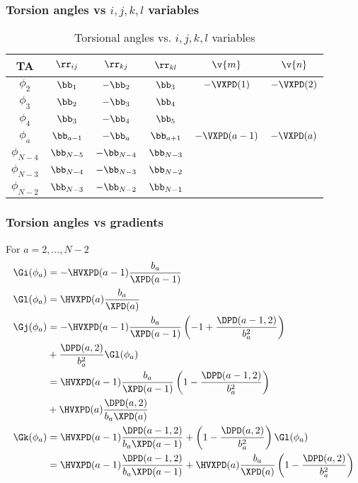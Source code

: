 \clearpage
\subsubsection{Torsion angles vs $i, j, k, l$ variables }

\begin{table}
  \centering
  \caption{Torsional angles vs. $i, j, k, l$ variables}
  \begin{tabular}{|*{6}{c|}}
\hline
TA 		& $\rr_{ij}$ 	& $\rr_{kj}$ 	& $\rr_{kl}$	& $\v{m}$	& $\v{n}$	  	\\
\hline
$\phi_2$	& $\bb_1$	& $-\bb_2$ 	& $\bb_3$	& $-\VXPD(1)$ 	& $-\VXPD(2)$ 		\\
$\phi_3$	& $\bb_2$	& $-\bb_3$	& $\bb_4$		\\
$\phi_4$	& $\bb_3$	& $-\bb_4$	& $\bb_5$		\\
$\phi_a$	& $\bb_{a-1}$	& $-\bb_a$	& $\bb_{a+1}$	& $-\VXPD(a-1)$ & $-\VXPD(a)$ 		\\
$\phi_{N-4}$	& $\bb_{N-5}$	& $-\bb_{N-4}$	& $\bb_{N-3}$		\\
$\phi_{N-3}$	& $\bb_{N-4}$	& $-\bb_{N-3}$	& $\bb_{N-2}$		\\
$\phi_{N-2}$	& $\bb_{N-3}$	& $-\bb_{N-2}$	& $\bb_{N-1}$		\\
\hline
  \end{tabular}
\end{table}

\clearpage
\subsubsection{Torsion angles vs gradients }

For $a=2,\ldots,N-2$
\begin{align}
  \Gi(\phi_a)&=-\HVXPD(a-1)\frac{b_{a}}{\XPD(a-1)}  \\
  \Gl(\phi_a)&=\HVXPD(a)\frac{b_{a}}{\XPD(a)} \\
  \Gj(\phi_a)&=-\HVXPD(a-1)\frac{b_{a}}{\XPD(a-1)}
  \left(-1+\frac{\DPD(a-1,2)}{b_a^2}\right)\\
  &+\frac{\DPD(a,2)}{b_a^2}\Gl(\phi_a)\\
  &=\HVXPD(a-1)\frac{b_{a}}{\XPD(a-1)}\left(1-\frac{\DPD(a-1,2)}{b_a^2}\right)\\
  &+\HVXPD(a)\frac{\DPD(a,2)}{b_a\XPD(a)}\\
  \Gk(\phi_a)&=\HVXPD(a-1)\frac{\DPD(a-1,2)}{b_a\XPD(a-1)}+\left(1-\frac{\DPD(a,2)}{b_a^2}\right)\Gl(\phi_a)\\
  &=\HVXPD(a-1)\frac{\DPD(a-1,2)}{b_a\XPD(a-1)}+
  \HVXPD(a)\frac{b_{a}}{\XPD(a)}\left(1-\frac{\DPD(a,2)}{b_a^2}\right)
\end{align}

